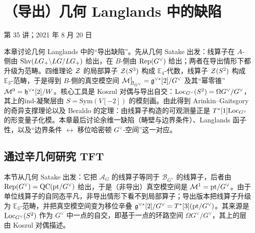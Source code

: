 \chapter{（导出）几何 Langlands 中的缺陷}\label{ch:16}

\begin{flushright}\small 第 35 讲；2021 年 8 月 20 日\end{flushright}

\begin{keytakeaways}
本章讨论几何 Langlands 中的“导出缺陷”。先从几何 Satake 出发：线算子在 $A$-侧由 $\mathrm{Shv}(LG_+\backslash LG/LG_+)$ 给出，在 $B$-侧由 $\mathrm{Rep}(G^\vee)$ 给出；两者在导出情形下都升级为范畴。四维理论 $\mathcal{Z}$ 的局部算子 $\mathcal{Z}(S^3)$ 构成 $\mathbb{E}_4$-代数，线算子 $\mathcal{Z}(S^2)$ 构成 $\mathbb{E}_3$-范畴，于是得到 $B$-侧的真空模空间 $\mathcal{M}^1_{B_{G^\vee}}=\mathfrak{g}^{\vee*}[2]/G^\vee$ 及其“幂零锥”$\mathcal{M}^0=\mathfrak{h}^{\vee*}[2]/W$。核心工具是 Koszul 对偶与导出自交：$\mathrm{Loc}_{G^\vee}(S^2)=\Omega G^\vee/G^\vee$，其上的ind-凝聚层由 $S=\mathrm{Sym}(V[-2])$ 的模刻画。由此得到 Arinkin--Gaitsgory 的奇异支撑理论以及 Beraldo 的定理：由线算子构造的可观测量正是 $T^*[1]\mathrm{Loc}_{G^\vee}$ 的形变量子化模。本章最后讨论余维一缺陷（畴壁与边界条件）、Langlands 函子性，以及“边界条件 $\leftrightarrow$ 移位哈密顿 $G^\vee$-空间”这一对应。
\end{keytakeaways}

\section{通过辛几何研究 TFT}
\begin{sectionkey}
本节从几何 Satake 出发：它把 $\mathcal{A}_G$ 的线算子等同于 $\mathcal{B}_{G^\vee}$ 的线算子，后者由 $\mathrm{Rep}(G^\vee)=\mathrm{QC}(\mathrm{pt}/G^\vee)$ 给出，于是（非导出）真空模空间是 $\mathcal{M}^1=\mathrm{pt}/G^\vee$。由于单位线算子的自同态平凡，非导出情形下看不到局部算子；导出版本把线算子升级为 $\mathbb{E}_3$-范畴，并把真空模空间变为移位辛叠 $\mathfrak{g}^{\vee*}[2]/G^\vee=T^*[3](\mathrm{pt}/G^\vee)$。其来源是 $\mathrm{Loc}_{G^\vee}(S^2)$ 作为 $G^\vee$ 中一点的自交，即基于一点的环路空间 $\Omega G^\vee/G^\vee$，其上的层由 Koszul 对偶描述。
\end{sectionkey}

